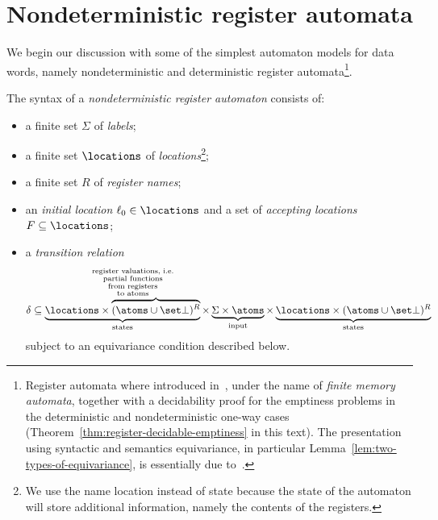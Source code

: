 \section{Nondeterministic register automata}
We begin our discussion with some of the simplest automaton models for data words, namely nondeterministic and deterministic register automata\footnote{Register automata where introduced in~\cite{DBLP:journals/tcs/KaminskiF94}, under the name of \emph{finite memory automata}, together with a decidability proof for the emptiness problems in the deterministic and nondeterministic one-way cases (Theorem~\ref{thm:register-decidable-emptiness} in this text). The presentation using syntactic and semantics equivariance, in particular Lemma~\ref{lem:two-types-of-equivariance}, is essentially due to~\cite{DBLP:journals/mst/Bojanczyk13,DBLP:journals/corr/BojanczykKL14}.
 }. 
\begin{definition}
	The syntax of a \emph{nondeterministic register automaton} consists of:
\begin{itemize}
	\item a finite set $\Sigma$ of \emph{labels};
	\item a finite set $\locations$ of \emph{locations}\footnote{We use the name location instead of state because the state of the automaton will store additional information, namely the contents of the registers.};
	\item a finite set $R$ of \emph{register names};
	\item an \emph{initial location} $\ell_0 \in \locations$ and a set of \emph{accepting locations} $F \subseteq \locations$;
	\item a \emph{transition relation}
\begin{align}\label{eq:register-automaton-transitions}
 \delta \subseteq \underbrace{\locations \times \overbrace{(\atoms \cup \set \bot)^R}}^{ \qquad \substack{\text{register valuations, i.e.}\\\text{partial functions}\\ \text{from registers}\\ \text{to atoms}}
 }
 _{\text{states}} \times \underbrace{\Sigma \times \atoms}_{\text{input}} \times \underbrace{\locations \times (\atoms \cup \set \bot)^R}_{\text{states}}
\end{align}
 subject to an equivariance condition described below.	
\end{itemize}
\end{definition}



